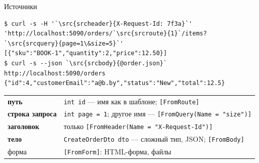 \documentclass[aspectratio=169,10pt,t]{beamer}
\newcommand{\src}[2]{\textcolor{#1}{\textbf{#2}}}
\newcommand{\termsm}{\ttfamily\fontsize{6.6}{7.9}\selectfont}
\begin{document}
\begin{frame}[fragile]{Источники}
  \slidetop

\begin{lstlisting}[style=term,basicstyle=\termsm,escapechar=`]
$ curl -s -H '`\src{srcheader}{X-Request-Id: 7f3a}`' 'http://localhost:5090/orders/`\src{srcroute}{1}`/items?`\src{srcquery}{page=1\&size=5}`'
[{"sku":"BOOK-1","quantity":2,"price":12.50}]
$ curl -s --json `\src{srcbody}{@order.json}` http://localhost:5090/orders
{"id":4,"customerEmail":"a@b.by","status":"New","total":12.5}
\end{lstlisting}

  {\renewcommand{\arraystretch}{1.2}\small
  \begin{tabular}{@{}L{3.0cm}L{9.8cm}@{}}
    \src{srcroute}{путь}            & \texttt{int id} --- имя как в шаблоне;
      \texttt{[FromRoute]} \\
    \src{srcquery}{строка запроса}  & \texttt{int page = 1}; другое имя ---
      \texttt{[FromQuery(Name = "size")]} \\
    \src{srcheader}{заголовок}      & только \texttt{[FromHeader(Name =
      "X-Request-Id")]} \\
    \src{srcbody}{тело}             & \texttt{CreateOrderDto dto} --- сложный тип, JSON;
      \texttt{[FromBody]} \\
    форма                           & \texttt{[FromForm]}: HTML-форма, файлы \\
  \end{tabular}}

\end{frame}

\begin{frame}[plain]
\end{frame}
\end{document}
